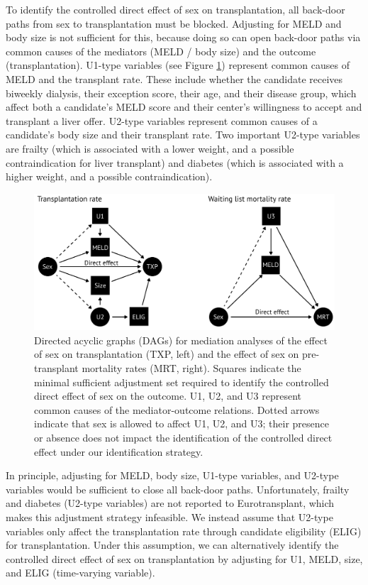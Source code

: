 \documentclass[11pt,twoside,]{book}
\begin{document}
To identify the controlled direct effect of sex on transplantation, all back-door
paths from sex to transplantation must be blocked. Adjusting
for MELD and body size is not sufficient for this, because doing so can open
back-door paths via common causes of the mediators (MELD / body size)
and the outcome (transplantation). U1-type variables (see Figure \ref{fig:ch4fig1})
represent common causes of MELD and the transplant rate. These include
whether the candidate receives biweekly dialysis, their exception score, their age, and
their disease group, which affect both a candidate's MELD score and their center's
willingness to accept and transplant a liver offer. U2-type variables represent
common causes of a candidate's body size and their transplant rate. Two
important U2-type variables are frailty (which is associated with a lower weight,
and a possible contraindication for liver transplant) and diabetes (which is
associated with a higher weight, and a possible contraindication).

\begin{figure}[ht]

{\centering \includegraphics[width=1\linewidth]{figures/ch4/fig1_plot_causal_models} 

}

\caption{Directed acyclic graphs (DAGs) for mediation analyses of the effect of sex on transplantation (TXP, left) and the effect of sex on pre-transplant mortality rates (MRT, right). Squares indicate the minimal sufficient adjustment set required to identify the controlled direct effect of sex on the outcome. U1, U2, and U3 represent common causes of the mediator-outcome relations. Dotted arrows indicate that sex is allowed to affect U1, U2, and U3; their presence or absence does not impact the identification of the controlled direct effect under our identification strategy.}\label{fig:ch4fig1}
\end{figure}

In principle, adjusting for MELD, body size, U1-type variables, and U2-type variables would
be sufficient to close all back-door paths. Unfortunately, frailty and diabetes (U2-type
variables) are not reported to Eurotransplant, which makes this adjustment strategy
infeasible. We instead assume that U2-type variables only affect the transplantation
rate through candidate eligibility (ELIG) for transplantation. Under this assumption,
we can alternatively identify the controlled direct effect of sex on transplantation
by adjusting for U1, MELD, size, and ELIG (time-varying variable).
\end{document}
